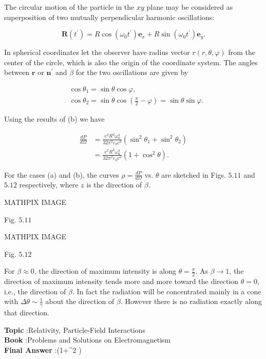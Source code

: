 \documentclass[10pt]{article}
\begin{document}
 The circular motion of the particle in the $x y$ plane may be considered as superposition of two mutually perpendicular harmonic oscillations:

$$
\mathbf{R}\left(t^{\prime}\right)=R \cos \left(\omega_{0} t^{\prime}\right) \mathbf{e}_{x}+R \sin \left(\omega_{0} t^{\prime}\right) \mathbf{e}_{y} .
$$

In spherical coordinates let the observer have radius vector $r(r, \theta, \varphi)$ from the center of the circle, which is also the origin of the coordinate system. The angles between $\mathbf{r}$ or $\mathbf{n}^{\prime}$ and $\dot{\beta}$ for the two oscillations are given by

$$
\begin{aligned}
&\cos \theta_{1}=\sin \theta \cos \varphi, \\
&\cos \theta_{2}=\sin \theta \cos \left(\frac{\pi}{2}-\varphi\right)=\sin \theta \sin \varphi .
\end{aligned}
$$

Using the results of (b) we have

$$
\begin{aligned}
\frac{d P}{d \Omega} &=\frac{e^{2} R^{2} \omega_{0}^{4}}{32 \pi^{2} \varepsilon_{0} c^{3}}\left(\sin ^{2} \theta_{1}+\sin ^{2} \theta_{2}\right) \\
&=\frac{e^{2} R^{2} \omega_{0}^{4}}{32 \pi^{2} \varepsilon_{0} c^{3}}\left(1+\cos ^{2} \theta\right) .
\end{aligned}
$$

 For the cases (a) and (b), the curves $\rho=\frac{d P}{d \Omega}$ vs. $\theta$ are sketched in Figs. $5.11$ and $5.12$ respectively, where $z$ is the direction of $\dot{\beta}$.

MATHPIX IMAGE

Fig. $5.11$ 

MATHPIX IMAGE

Fig. $5.12$

 For $\beta \approx 0$, the direction of maximum intensity is along $\theta=\frac{\pi}{2}$. As $\beta \rightarrow 1$, the direction of maximum intensity tends more and more toward the direction $\theta=0$, i.e., the direction of $\dot{\beta}$. In fact the radiation will be concentrated mainly in a cone with $\Delta \theta \sim \frac{1}{\gamma}$ about the direction of $\dot{\beta}$. However there is no radiation exactly along that direction.

\textbf{Topic} :Relativity, Particle-Field Interactions\\
\textbf{Book} :Problems and Solutions on Electromagnetism\\
\textbf{Final Answer} :\left(1+\cos ^{2} \theta\right)\\
\end{document}
